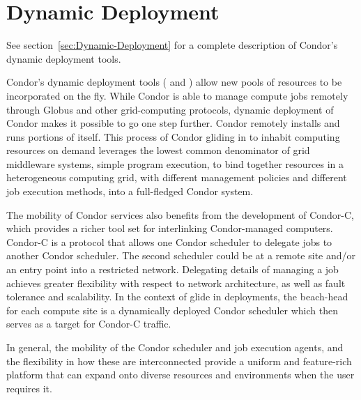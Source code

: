 \section{\label{sec:Deployment}Dynamic Deployment}

See section~\ref{sec:Dynamic-Deployment}
for a complete description of Condor's dynamic deployment tools.

Condor's dynamic deployment tools
( and )
allow new pools of resources to be  incorporated on the fly.
While Condor is able to manage compute jobs remotely 
through Globus and other grid-computing protocols,
dynamic deployment of Condor makes it possible to go one step further.
Condor remotely installs and runs portions of itself.
This process of Condor gliding in to inhabit computing resources
on demand leverages the lowest common denominator of grid middleware systems,
simple program  execution,
to bind together resources in a heterogeneous computing grid,
with different management policies and different job execution methods,
into a full-fledged Condor system. 

The mobility of Condor services also benefits from
the development  of Condor-C,
which provides a richer tool set for interlinking Condor-managed computers.
Condor-C is a protocol that allows one Condor scheduler
to delegate jobs to another Condor scheduler.
The second scheduler could be at a remote site and/or an entry point
into a restricted network.
Delegating details of managing a job
achieves greater flexibility with respect to network architecture,
as well as fault tolerance and scalability.
In the  context of glide in deployments,
the beach-head for each compute site is a dynamically deployed
Condor scheduler which then serves as a target for Condor-C traffic.

In general,
the mobility of the Condor scheduler and job execution agents,
and the flexibility in how these are interconnected
provide a uniform and feature-rich platform
that can expand onto diverse resources and environments
when the user requires it.


